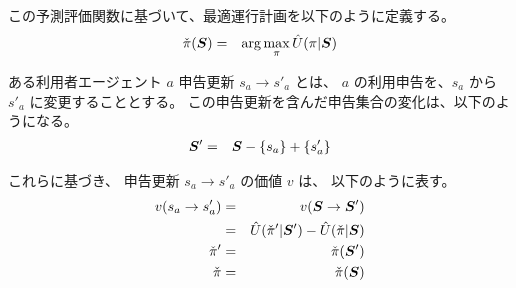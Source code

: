 この予測評価関数に基づいて、最適運行計画を以下のように定義する。
  \begin{eqnarray}
    \check{\pi}({\bm{S}})
      & = &
        \arg\max_{\pi} \hat{U}(\pi | {\bm{S}})
  \end{eqnarray}

ある利用者エージェント $a$ 申告更新 $s_a \to s'_a$ とは、
$a$ の利用申告を、$s_a$ から $s'_a$ に変更することとする。
この申告更新を含んだ申告集合の変化は、以下のようになる。
  \begin{eqnarray}
    {\bm{S}}' & = & {\bm{S}} - \left\{ s_a \right\} + \left\{ s'_a \right\}
  \end{eqnarray}

これらに基づき、
申告更新 $s_a \to s'_a$ の価値 $v$ は、
以下のように表す。
  \begin{eqnarray}
    v(s_a \to s'_a) & = & v({\bm{S}} \to {\bm{S}}')
  \\
      & = &
        \hat{U}(\check{\pi}' | {\bm{S}}') -
        \hat{U}(\check{\pi} | {\bm{S}})
  \\
    \check{\pi}' & = & \check{\pi}({\bm{S}}')
  \\
    \check{\pi} & = & \check{\pi}({\bm{S}})
  \end{eqnarray}




